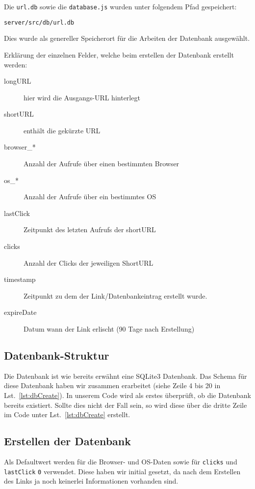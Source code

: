 \documentclass[a4paper,11pt,DIV=12,overfullrule=on]{scrreprt}%
\begin{document}
Die \texttt{url.db} sowie die \texttt{database.js} wurden unter folgendem Pfad gespeichert:

\texttt{server/src/db/url.db}


Dies wurde als genereller Speicherort für die Arbeiten der Datenbank ausgewählt.


Erklärung der einzelnen Felder, welche beim erstellen der Datenbank erstellt werden:

\begin{description}
    \item[longURL] hier wird die Ausgangs-URL hinterlegt
    \item[shortURL] enthält die gekürzte URL
    \item[browser\_*] Anzahl der Aufrufe über einen bestimmten Browser
    \item[os\_*] Anzahl der Aufrufe über ein bestimmtes OS
    \item[lastClick] Zeitpunkt des letzten Aufrufs der shortURL
    \item[clicks] Anzahl der Clicks der jeweiligen ShortURL
    \item[timestamp] Zeitpunkt zu dem der Link/Datenbankeintrag erstellt wurde.
    \item[expireDate] Datum wann der Link erlischt (90 Tage nach Erstellung)
\end{description}

\subsection{Datenbank-Struktur}
Die Datenbank ist wie bereits erwähnt eine SQLite3 Datenbank. Das Schema für diese Datenbank haben wir zusammen erarbeitet (siehe Zeile 4 bis 20 in Lst.~\ref{lst:dbCreate}). In unserem Code wird als erstes überprüft, ob die Datenbank bereits existiert. Sollte dies nicht der Fall sein, so wird diese über die dritte Zeile im Code unter Lst.~\ref{lst:dbCreate} erstellt. 

\subsection{Erstellen der Datenbank}
Als Defaultwert werden für die Browser- und OS-Daten sowie für \texttt{clicks} und \texttt{lastClick} \texttt{0} verwendet. Diese haben wir initial gesetzt, da nach dem Erstellen des Links ja noch keinerlei Informationen vorhanden sind.
\end{document}
